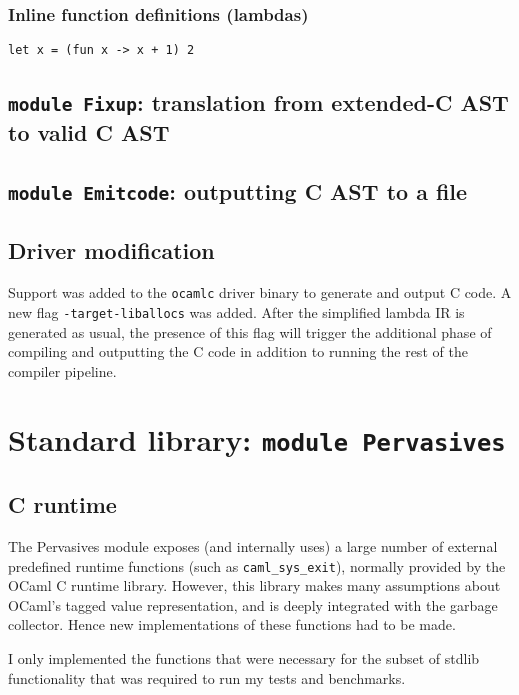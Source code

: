 \documentclass[12pt,a4paper,twoside,openright]{report}
\begin{document}
\subsubsection{Inline function definitions (lambdas)}

\begin{lstlisting}
let x = (fun x -> x + 1) 2
\end{lstlisting}

\subsection{\lstinline!module Fixup!: translation from extended-C AST to valid C AST}

\subsection{\lstinline!module Emitcode!: outputting C AST to a file}

\subsection{Driver modification}

Support was added to the \lstinline!ocamlc! driver binary to generate and output C code. A new flag \lstinline!-target-liballocs! was added. After the simplified lambda IR is generated as usual, the presence of this flag will trigger the additional phase of compiling and outputting the C code in addition to running the rest of the compiler pipeline.

\section{Standard library: \lstinline!module Pervasives!}

\subsection{C runtime}

The Pervasives module exposes (and internally uses) a large number of external predefined runtime functions (such as \lstinline!caml_sys_exit!), normally provided by the OCaml C runtime library. However, this library makes many assumptions about OCaml's tagged value representation, and is deeply integrated with the garbage collector. Hence new implementations of these functions had to be made.

I only implemented the functions that were necessary for the subset of stdlib functionality that was required to run my tests and benchmarks.
\end{document}

